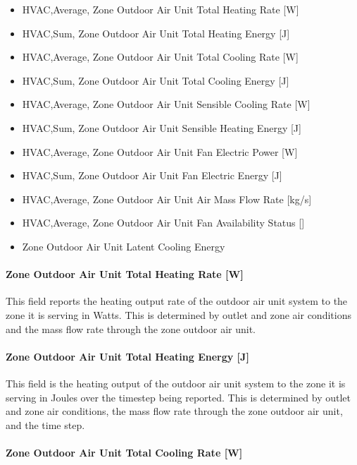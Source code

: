 \begin{itemize}
\item
  HVAC,Average, Zone Outdoor Air Unit Total Heating Rate {[}W{]}
\item
  HVAC,Sum, Zone Outdoor Air Unit Total Heating Energy {[}J{]}
\item
  HVAC,Average, Zone Outdoor Air Unit Total Cooling Rate {[}W{]}
\item
  HVAC,Sum, Zone Outdoor Air Unit Total Cooling Energy {[}J{]}
\item
  HVAC,Average, Zone Outdoor Air Unit Sensible Cooling Rate {[}W{]}
\item
  HVAC,Sum, Zone Outdoor Air Unit Sensible Heating Energy {[}J{]}
\item
  HVAC,Average, Zone Outdoor Air Unit Fan Electric Power {[}W{]}
\item
  HVAC,Sum, Zone Outdoor Air Unit Fan Electric Energy {[}J{]}
\item
  HVAC,Average, Zone Outdoor Air Unit Air Mass Flow Rate {[}kg/s{]}
\item
  HVAC,Average, Zone Outdoor Air Unit Fan Availability Status {[]}
\item
  Zone Outdoor Air Unit Latent Cooling Energy
\end{itemize}

\paragraph{Zone Outdoor Air Unit Total Heating Rate {[}W{]}}\label{zone-outdoor-air-unit-total-heating-rate-w}

This field reports the heating output rate of the outdoor air unit system to the zone it is serving in Watts. This is determined by outlet and zone air conditions and the mass flow rate through the zone outdoor air unit.

\paragraph{Zone Outdoor Air Unit Total Heating Energy {[}J{]}}\label{zone-outdoor-air-unit-total-heating-energy-j}

This field is the heating output of the outdoor air unit system to the zone it is serving in Joules over the timestep being reported. This is determined by outlet and zone air conditions, the mass flow rate through the zone outdoor air unit, and the time step.

\paragraph{Zone Outdoor Air Unit Total Cooling Rate {[}W{]}}\label{zone-outdoor-air-unit-total-cooling-rate-w}

